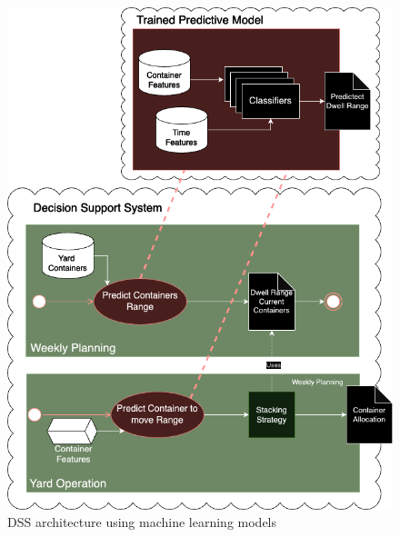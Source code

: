 		\begin{figure}[ht]
			\centering
			\includegraphics[width=1\textwidth]{images/DSS}
			\caption{DSS architecture using machine learning models}
			\label{fig:dds_architecture}
		\end{figure}
